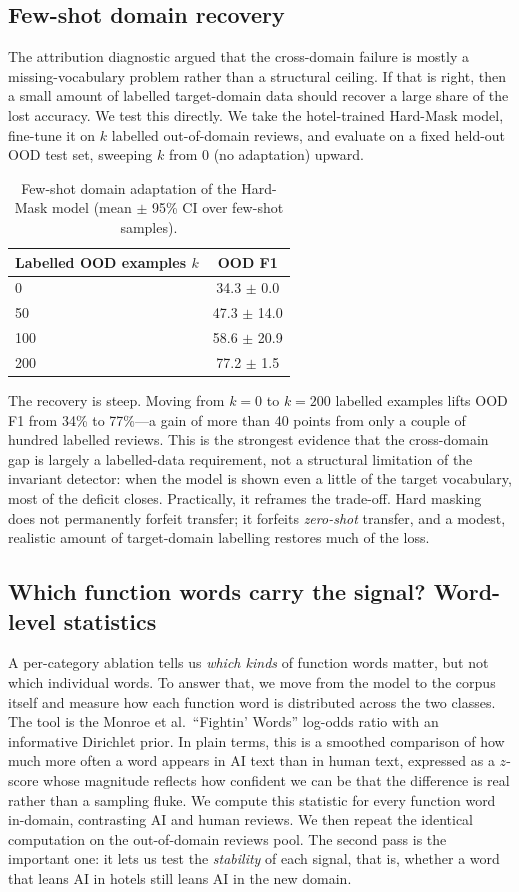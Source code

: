 \documentclass[10pt,twocolumn]{article}
\begin{document}
\subsection{Few-shot domain recovery}\label{sec:fewshot}
The attribution diagnostic argued that the cross-domain failure is mostly a missing-vocabulary problem rather than a structural ceiling. If that is right, then a small amount of labelled target-domain data should recover a large share of the lost accuracy. We test this directly. We take the hotel-trained Hard-Mask model, fine-tune it on $k$ labelled out-of-domain reviews, and evaluate on a fixed held-out OOD test set, sweeping $k$ from 0 (no adaptation) upward.
\begin{table}[tb]\centering
\caption{Few-shot domain adaptation of the Hard-Mask model (mean $\pm$ 95\% CI over few-shot samples).}
\label{tab:fewshot}
\footnotesize
\begin{tabular}{lc}
\toprule
Labelled OOD examples $k$ & OOD F1 \\
\midrule
0 & 34.3 $\pm$ 0.0 \\
50 & 47.3 $\pm$ 14.0 \\
100 & 58.6 $\pm$ 20.9 \\
200 & 77.2 $\pm$ 1.5 \\
\bottomrule
\end{tabular}
\end{table}
The recovery is steep. Moving from $k=0$ to $k=200$ labelled examples lifts OOD F1 from 34\% to 77\%---a gain of more than 40 points from only a couple of hundred labelled reviews. This is the strongest evidence that the cross-domain gap is largely a labelled-data requirement, not a structural limitation of the invariant detector: when the model is shown even a little of the target vocabulary, most of the deficit closes. Practically, it reframes the trade-off. Hard masking does not permanently forfeit transfer; it forfeits \emph{zero-shot} transfer, and a modest, realistic amount of target-domain labelling restores much of the loss.

\subsection{Which function words carry the signal? Word-level statistics}
A per-category ablation tells us \emph{which kinds} of function words matter, but not which individual words. To answer that, we move from the model to the corpus itself and measure how each function word is distributed across the two classes. The tool is the Monroe et al.\ ``Fightin' Words'' log-odds ratio with an informative Dirichlet prior. In plain terms, this is a smoothed comparison of how much more often a word appears in AI text than in human text, expressed as a $z$-score whose magnitude reflects how confident we can be that the difference is real rather than a sampling fluke. We compute this statistic for every function word in-domain, contrasting AI and human reviews. We then repeat the identical computation on the out-of-domain reviews pool. The second pass is the important one: it lets us test the \emph{stability} of each signal, that is, whether a word that leans AI in hotels still leans AI in the new domain.
\end{document}
